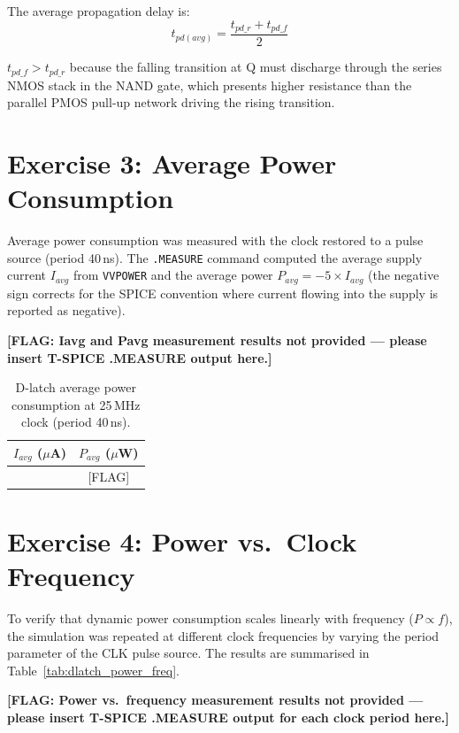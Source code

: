 \documentclass[12pt, a4paper]{article}
\begin{document}
The average propagation delay is:
\[
    t_{pd(avg)} = \frac{t_{pd\_r} + t_{pd\_f}}{2}
\]

$t_{pd\_f} > t_{pd\_r}$ because the falling transition at Q must discharge through the series NMOS stack in the NAND gate, which presents higher resistance than the parallel PMOS pull-up network driving the rising transition.

\section{Exercise 3: Average Power Consumption}

Average power consumption was measured with the clock restored to a pulse source (period 40\,ns). The \texttt{.MEASURE} command computed the average supply current $I_{avg}$ from \texttt{VVPOWER} and the average power $P_{avg} = -5 \times I_{avg}$ (the negative sign corrects for the SPICE convention where current flowing into the supply is reported as negative).

\textbf{[FLAG: Iavg and Pavg measurement results not provided --- please insert T-SPICE .MEASURE output here.]}

\begin{table}[H]
    \centering
    \caption{D-latch average power consumption at 25\,MHz clock (period 40\,ns).}
    \label{tab:dlatch_power}
    \begin{tabular}{cc}
        \toprule
        $I_{avg}$ ($\mu$A) & $P_{avg}$ ($\mu$W) \\
        \midrule
        [FLAG] & [FLAG] \\
        \bottomrule
    \end{tabular}
\end{table}

\section{Exercise 4: Power vs.\ Clock Frequency}

To verify that dynamic power consumption scales linearly with frequency ($P \propto f$), the simulation was repeated at different clock frequencies by varying the period parameter of the CLK pulse source. The results are summarised in Table~\ref{tab:dlatch_power_freq}.

\textbf{[FLAG: Power vs.\ frequency measurement results not provided --- please insert T-SPICE .MEASURE output for each clock period here.]}
\end{document}
